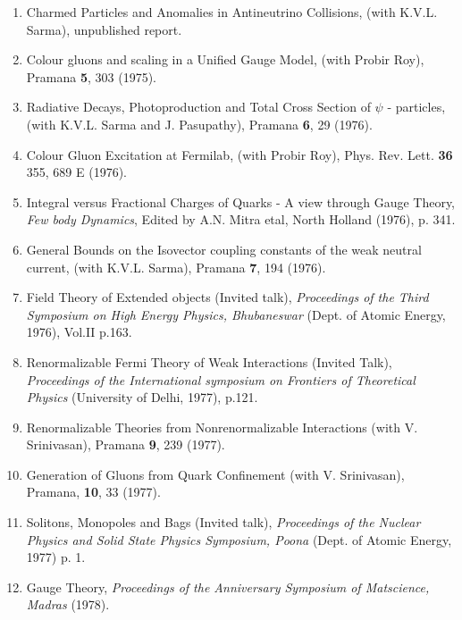 \begin{enumerate}
\item Charmed Particles and Anomalies in Antineutrino Collisions, (with
K.V.L. Sarma), unpublished report. 

\item Colour gluons and scaling in a Unified Gauge Model, (with Probir
Roy), Pramana {\bf 5}, 303 (1975).

\item Radiative Decays, Photoproduction and Total Cross Section of
$\psi$ - particles, (with K.V.L. Sarma and J. Pasupathy), Pramana {\bf
6}, 29 (1976).

\item Colour Gluon Excitation at Fermilab, (with Probir Roy), Phys. Rev.
Lett. {\bf 36} 355, 689 E (1976).

\item Integral versus Fractional Charges of Quarks - A view  thro\-ugh Gauge Theory, {\em Few body Dynamics}, Edited by A.N. Mitra etal, North
Holland (1976), p. 341.

\item General Bounds on the Isovector coupling constants of the weak
neutral current, (with K.V.L. Sarma), Pramana {\bf 7}, 194 (1976).

\item Field Theory of Extended objects (Invited talk), {\it Procee\-dings of
the Third Symposium on High Energy Physics, Bhubaneswar} (Dept. of
Atomic Energy, 1976), Vol.II p.163.

\item Renormalizable Fermi Theory of Weak Interactions (Invited Talk), 
{\it Proceedings of the International symposium on Frontiers of Theoretical
Physics} (University of Delhi, 1977), p.121.

\item Renormalizable Theories from Nonrenormalizable Interac\-tions (with
V. Srinivasan), Pramana {\bf 9}, 239 (1977).

\item Generation of Gluons from Quark Confinement (with V. Srinivasan), 
Pramana, {\bf 10}, 33 (1977).

\item Solitons, Monopoles and Bags (Invited talk), {\it Proceedings of the
Nuclear Physics and Solid State Physics Symposium, Poona} (Dept. of
Atomic Energy, 1977) p. 1.

\item Gauge Theory, {\it Proceedings of the Anniversary Symposium of
Matscience, Madras} (1978).


\end{enumerate}
